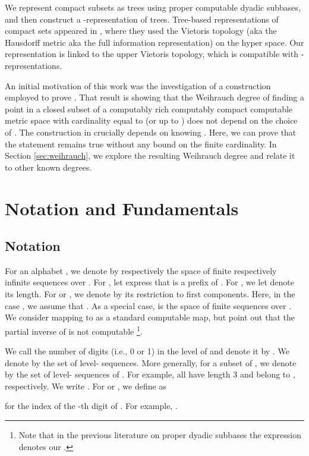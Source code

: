 \documentclass{eptcs-modified}
\begin{document}
  We represent compact subsets as trees using proper computable dyadic subbases,
and then construct a -representation of trees.
  Tree-based representations of compact sets appeared in \cite{berger}, where they used the Vietoris topology (aka the Hausdorff metric aka the full information representation) on the hyper space.  Our representation is linked to the upper Vietoris topology, which is compatible with -representations.

An initial motivation of this work was the investigation of a construction employed to prove \cite[Proposition 1.9]{paulyleroux}. That result is showing that the Weihrauch degree of finding a point in a closed subset of a computably rich computably compact computable metric space  with cardinality equal to  (or up to ) does not depend on the choice of . The construction in \cite{paulyleroux} crucially depends on knowing . Here, we can prove that the statement remains true without any bound on the finite cardinality. In Section \ref{sec:weihrauch}, we explore the resulting Weihrauch degree and relate it to other known degrees.

\section{Notation and Fundamentals}

\subsection{Notation}\label{section-notation}
For an alphabet , we denote by  respectively  the space of
finite respectively infinite sequences over .
For , let  express that  is a prefix of .
For , we let  denote its length.
For  or , we denote by  its restriction to first  components.  Here, in the case , we assume that .
As a special case,  is the space of finite sequences over .
We consider  mapping  to  as a standard computable map, but point out that the partial inverse of  is not computable
\footnote{Note that in the previous literature on proper dyadic subbases the expression  denotes our
.}.

We call the number of digits (i.e., 0 or 1) in   the level of 
and denote it by .
We denote by  the set of level- sequences.
More generally, for a subset  of ,
we denote by  the set of level- sequences of .
For example,
 all have length 3 and
belong to , respectively.
We write .
For  or , we define  as

for  the index of the -th digit of . For example, .
\end{document}
